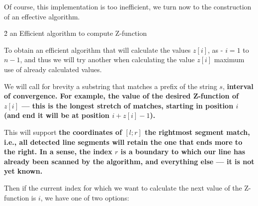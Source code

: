 Of course, this implementation is too inefficient, we turn now to the construction of an effective algorithm.


\h2{ an Efficient algorithm to compute Z-function }

To obtain an efficient algorithm that will calculate the values $z[i]$, as - $i=1$ to $n-1$, and thus we will try another when calculating the value $z[i]$ maximum use of already calculated values.

We will call for brevity a substring that matches a prefix of the string $s$, \bf{interval of convergence}. For example, the value of the desired Z-function of $z[i]$ --- this is the longest stretch of matches, starting in position $i$ (and end it will be at position $i + z[i] - 1$).

This will support \bf{the coordinates of $[l;r]$ the rightmost segment match}, i.e., all detected line segments will retain the one that ends more to the right. In a sense, the index $r$ is a boundary to which our line has already been scanned by the algorithm, and everything else --- it is not yet known.

Then if the current index for which we want to calculate the next value of the Z-function is $i$, we have one of two options:

